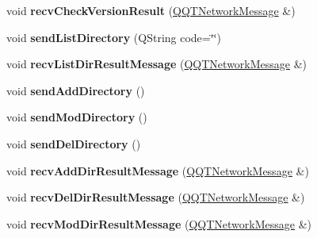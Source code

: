 \begin{DoxyCompactItemize}
void {\bfseries recv\+Check\+Version\+Result} (\mbox{\hyperlink{class_q_q_t_network_message}{Q\+Q\+T\+Network\+Message}} \&)
\item 
\mbox{\label{class_q_q_t_cloud_protocol_a0ee16c0b6fc96268bad4227c72c49bb6}} 
void {\bfseries send\+List\+Directory} (Q\+String code=\char`\"{}\char`\"{})
\item 
\mbox{\label{class_q_q_t_cloud_protocol_aab38a909b27459af75f9fcda2e9966d0}} 
void {\bfseries recv\+List\+Dir\+Result\+Message} (\mbox{\hyperlink{class_q_q_t_network_message}{Q\+Q\+T\+Network\+Message}} \&)
\item 
\mbox{\label{class_q_q_t_cloud_protocol_aaca22997054dac14743e2490892326e1}} 
void {\bfseries send\+Add\+Directory} ()
\item 
\mbox{\label{class_q_q_t_cloud_protocol_a58db8e9d583b940ea0f96a180da3ba01}} 
void {\bfseries send\+Mod\+Directory} ()
\item 
\mbox{\label{class_q_q_t_cloud_protocol_ae72025ecb7feae13463cf150bc893b6e}} 
void {\bfseries send\+Del\+Directory} ()
\item 
\mbox{\label{class_q_q_t_cloud_protocol_ae96d18a6a11fc0dd5c1f75d03de10c5c}} 
void {\bfseries recv\+Add\+Dir\+Result\+Message} (\mbox{\hyperlink{class_q_q_t_network_message}{Q\+Q\+T\+Network\+Message}} \&)
\item 
\mbox{\label{class_q_q_t_cloud_protocol_aff78b3135ea136f1da21d9e1927c2ef7}} 
void {\bfseries recv\+Del\+Dir\+Result\+Message} (\mbox{\hyperlink{class_q_q_t_network_message}{Q\+Q\+T\+Network\+Message}} \&)
\item 
\mbox{\label{class_q_q_t_cloud_protocol_a40f7a147968db6c67008bd418ca8ebee}} 
void {\bfseries recv\+Mod\+Dir\+Result\+Message} (\mbox{\hyperlink{class_q_q_t_network_message}{Q\+Q\+T\+Network\+Message}} \&)
\item 
\mbox{\label{class_q_q_t_cloud_protocol_a9a26471a428fa2646541d6ee69e024c8}} 

\end{DoxyCompactItemize}
